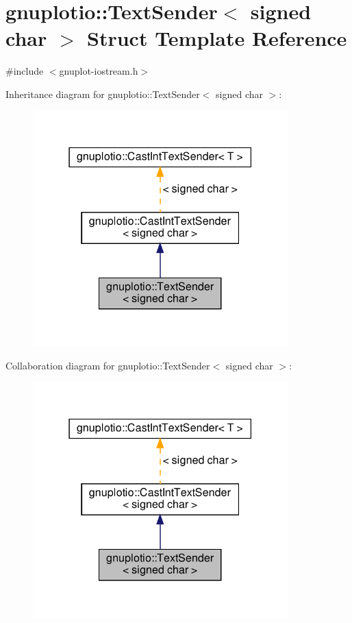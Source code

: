 \hypertarget{structgnuplotio_1_1_text_sender_3_01signed_01char_01_4}{}\section{gnuplotio\+:\+:Text\+Sender$<$ signed char $>$ Struct Template Reference}
\label{structgnuplotio_1_1_text_sender_3_01signed_01char_01_4}


{\ttfamily \#include $<$gnuplot-\/iostream.\+h$>$}



Inheritance diagram for gnuplotio\+:\+:Text\+Sender$<$ signed char $>$\+:
\nopagebreak
\begin{figure}[H]
\begin{center}
\leavevmode
\includegraphics[width=279pt]{structgnuplotio_1_1_text_sender_3_01signed_01char_01_4__inherit__graph}
\end{center}
\end{figure}


Collaboration diagram for gnuplotio\+:\+:Text\+Sender$<$ signed char $>$\+:
\nopagebreak
\begin{figure}[H]
\begin{center}
\leavevmode
\includegraphics[width=279pt]{structgnuplotio_1_1_text_sender_3_01signed_01char_01_4__coll__graph}
\end{center}
\end{figure}
